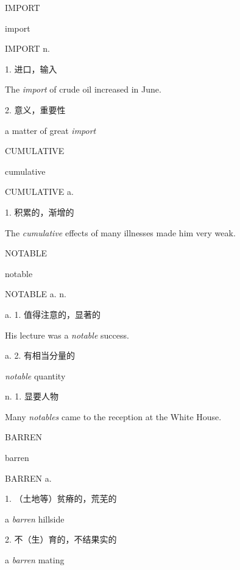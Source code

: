 \begin{flashcard}{
IMPORT

import
}
\begin{center}
IMPORT n. 
\end{center}
1. 进口，输入

The \textit{import} of crude oil increased in June.

2. 意义，重要性

a matter of great \textit{import}

\end{flashcard}
\begin{flashcard}{
CUMULATIVE

cumulative
}
\begin{center}
CUMULATIVE a. 
\end{center}
1. 积累的，渐增的

The \textit{cumulative} effects of many illnesses made him very weak.

\end{flashcard}
\begin{flashcard}{
NOTABLE

notable
}
\begin{center}
NOTABLE a. n. 
\end{center}
a. 1. 值得注意的，显著的

His lecture was a \textit{notable} success.

a. 2. 有相当分量的

\textit{notable} quantity

n. 1. 显要人物

Many \textit{notables} came to the reception at the White House.

\end{flashcard}
\begin{flashcard}{
BARREN

barren
}
\begin{center}
BARREN a. 
\end{center}
1. （土地等）贫瘠的，荒芜的

a \textit{barren} hillside

2. 不（生）育的，不结果实的

a \textit{barren} mating

\end{flashcard}
